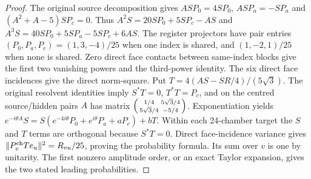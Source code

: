 \documentclass[11pt]{article}
\begin{document}
\begin{proof}
The original source decomposition gives $AS P_0=4SP_0$,
$AS P_a=-SP_a$ and $(A^2+A-5)SP_c=0$.  Thus
$A^2S=20SP_0+5SP_c-AS$ and
$A^3S=40SP_0+5SP_a-5SP_c+6AS$.
The register projectors have pair entries
$(P_0,P_a,P_c)=(1,3,-4)/25$ when one index is shared, and
$(1,-2,1)/25$ when none is shared.  Zero direct face contacts
between same-index blocks give the first two vanishing powers
and the third-power identity.  The six direct face incidences give
the direct norm-square.
Put $T=4(AS-SR/4)/(5\sqrt3)$.  The original resolvent
identities imply $S^*T=0$, $T^*T=P_c$, and on the centred
source/hidden pairs $A$ has matrix
$\begin{psmallmatrix}1/4&5\sqrt3/4\\5\sqrt3/4&-5/4\end{psmallmatrix}$.
Exponentiation yields
$e^{-i\theta A}S=S(e^{-4i\theta}P_0+e^{i\theta}P_a+aP_c)+bT$.
Within each 24-chamber target the $S$ and $T$ terms are
orthogonal because $S^*T=0$.  Direct face-incidence variance gives
$\|P_v^{\rm ch}Te_u\|^2=R_{vu}/25$, proving the probability
formula.  Its sum over $v$ is one by unitarity.  The first nonzero
amplitude order, or an exact Taylor expansion, gives the two
stated leading probabilities.
\end{proof}
\end{document}
